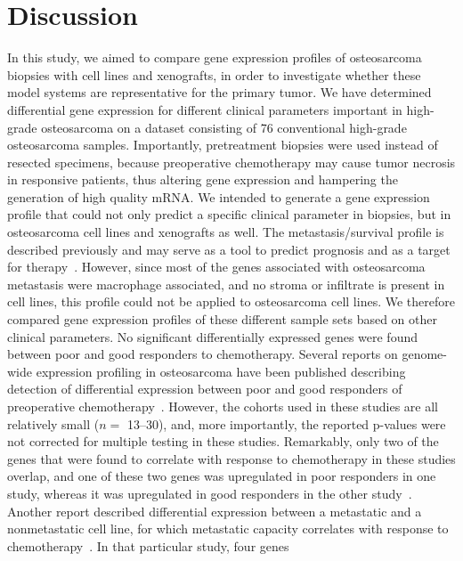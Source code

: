 \section{Discussion}\label{discussion3}
In this study, we aimed to compare gene expression
profiles of osteosarcoma biopsies with cell lines and
xenografts, in order to investigate whether these model
systems are representative for the primary tumor. We
have determined differential gene expression for different
clinical parameters important in high\hyp{}grade osteosarcoma
on a dataset consisting of 76 conventional
high\hyp{}grade osteosarcoma samples. Importantly, pretreatment
biopsies were used instead of resected specimens,
because preoperative chemotherapy may cause
tumor necrosis in responsive patients, thus altering gene
expression and hampering the generation of high quality
mRNA. We intended to generate a gene expression profile
that could not only predict a specific clinical parameter
in biopsies, but in osteosarcoma cell lines and
xenografts as well. The metastasis/survival profile is
described previously and may serve as a tool to predict
prognosis and as a target for therapy~\cite{buddingh2011tumor}. However,
since most of the genes associated with osteosarcoma
metastasis were macrophage associated, and no stroma
or infiltrate is present in cell lines, this profile could not
be applied to osteosarcoma cell lines. We therefore
compared gene expression profiles of these different
sample sets based on other clinical parameters. No significant
differentially expressed genes were found
between poor and good responders to chemotherapy.
Several reports on genome\hyp{}wide expression profiling in
osteosarcoma have been published describing detection
of differential expression between poor and good
responders of preoperative chemotherapy~\cite{mintz2005expression,ochi2004prediction,man2005expression,salas2009molecular}. However,
the cohorts used in these studies are all relatively
small ($n=$ 13--30), and, more importantly, the reported
p-values were not corrected for multiple testing in these
studies. Remarkably, only two of the genes that were
found to correlate with response to chemotherapy in
these studies overlap, and one of these two genes was
upregulated in poor responders in one study, whereas it
was upregulated in good responders in the other study~\cite{mintz2005expression,salas2009molecular}. Another report described differential expression
between a metastatic and a nonmetastatic cell line, for
which metastatic capacity correlates with response to
chemotherapy~\cite{walters2008identification}. In that particular study, four genes
